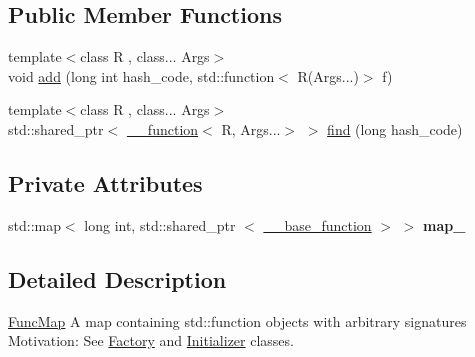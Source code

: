 \subsection*{\-Public \-Member \-Functions}
\begin{DoxyCompactItemize}
\item 
{\footnotesize template$<$class R , class... \-Args$>$ }\\void \hyperlink{classNeb_1_1FuncMap_aec4e7fa106d2843596ec782e310c60ab}{add} (long int hash\-\_\-code, std\-::function$<$ \-R(\-Args...)$>$ f)
\item 
{\footnotesize template$<$class R , class... \-Args$>$ }\\std\-::shared\-\_\-ptr$<$ \hyperlink{structNeb_1_1FuncMap_1_1____function}{\-\_\-\-\_\-function}$<$ \-R, \*
\-Args...$>$ $>$ \hyperlink{classNeb_1_1FuncMap_a77755854f1bac2503578c415c01dc0c3}{find} (long hash\-\_\-code)
\end{DoxyCompactItemize}
\subsection*{\-Private \-Attributes}
\begin{DoxyCompactItemize}
\item 
\hypertarget{classNeb_1_1FuncMap_ad95fe1cadcf903eb199555d7e9b5f5c0}{std\-::map$<$ long int, \*
std\-::shared\-\_\-ptr\*
$<$ \hyperlink{structNeb_1_1FuncMap_1_1____base__function}{\-\_\-\-\_\-base\-\_\-function} $>$ $>$ {\bfseries map\-\_\-}}\label{classNeb_1_1FuncMap_ad95fe1cadcf903eb199555d7e9b5f5c0}

\end{DoxyCompactItemize}


\subsection{\-Detailed \-Description}
\hyperlink{classNeb_1_1FuncMap}{\-Func\-Map} \-A map containing {\ttfamily std\-::function} objects with arbitrary signatures \-Motivation\-: \-See \hyperlink{classNeb_1_1Factory}{\-Factory} and \hyperlink{classNeb_1_1Initializer}{\-Initializer} classes. 

